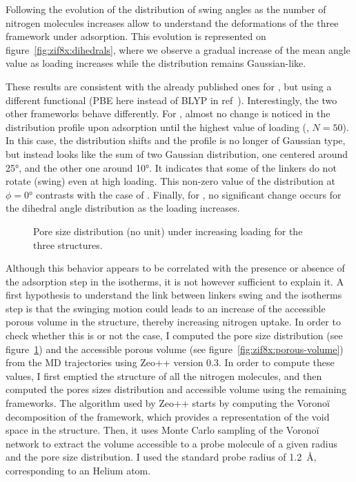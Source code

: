 \documentclass[thesis]{subfiles}
\begin{document}
Following the evolution of the distribution of swing angles as the number of
nitrogen molecules increases allow to understand the deformations of the three
framework under adsorption. This evolution is represented on
figure~\ref{fig:zif8x:dihedrals}, where we observe a gradual increase of the
mean angle value as loading increases while the distribution remains
Gaussian-like.

These results are consistent with the already published ones for
\cite{Coudert2017}, but using a different functional (PBE here instead of
BLYP in ref~\cite{Coudert2017}). Interestingly, the two other frameworks behave
differently. For \ZIFCl, almost no change is noticed in the distribution profile
upon adsorption until the highest value of loading (\ie, $N = 50$). In this
case, the distribution shifts and the profile is no longer of Gaussian type, but
instead looks like the sum of two Gaussian distribution, one centered around
25°, and the other one around 10°. It indicates that some of the linkers do not
rotate (swing) even at high loading. This non-zero value of the distribution at
$\phi = 0\text{°}$ contrasts with the case of . Finally, for \ZIFBr, no
significant change occurs for the dihedral angle distribution as the loading
increases.

\begin{figure}[ht]
    \centering
    
    \caption{Pore size distribution (no unit) under increasing loading for the
    three structures.}
    \label{fig:zif8x:pores-sizes}
\end{figure}

Although this behavior appears to be correlated with the presence or absence of
the adsorption step in the isotherms, it is not however sufficient to explain
it. A first hypothesis to understand the link between linkers swing and the
isotherms step is that the swinging motion could leads to an increase of the
accessible porous volume in the structure, thereby increasing nitrogen uptake.
In order to check whether this is or not the case, I computed the pore size
distribution (see figure~\ref{fig:zif8x:pores-sizes}) and the accessible porous
volume (see figure~\ref{fig:zif8x:porous-volume}) from the MD trajectories using
Zeo++\cite{Willems2012} version 0.3. In order to compute these values, I first
emptied the structure of all the nitrogen molecules, and then computed the pores
sizes distribution and accessible volume using the remaining frameworks. The
algorithm used by Zeo++ starts by computing the Voronoï decomposition of the
framework, which provides a representation of the void space in the structure.
Then, it uses Monte Carlo sampling of the Voronoï network to extract the volume
accessible to a probe molecule of a given radius and the pore size distribution.
I used the standard probe radius of \SI{1.2}{\AA}, corresponding to an Helium
atom.
\end{document}
